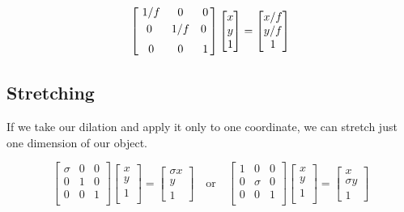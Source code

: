 \documentclass{article}
\begin{document}
\[%
    \begin{bmatrix} \vspace{1mm}
        \ 1/f  & 0 & 0 \\ \vspace{1mm} 
        0 & 1/f  & 0 \vspace{1mm}  \ \\ 
	    \ 0 & 0 & 1 \\		     
    \end{bmatrix}
    \begin{bmatrix} x\\y\\1 \end{bmatrix}
    =
    \begin{bmatrix}
        {x}/{f}  \\
        {y}/{f}  \\
		1 \\		
    \end{bmatrix}
\]%

\begin{figure}[!htbp]
    \centering
\end{figure}


\clearpage
\subsection{Stretching} 

If we take our dilation and apply it only to one coordinate, we can stretch just
one dimension of our object.

\[%
       \begin{bmatrix} 
        \sigma & 0 & 0 \\
		0 & 1 & 0 \\
		0 & 0 & 1 \\		
    \end{bmatrix}
    \begin{bmatrix}
        x \\
        y \\
		1 \\		
    \end{bmatrix}
    =
    \begin{bmatrix} \sigma x \\  y \\ 1 \end{bmatrix}
    \quad
    \text{or}
    \quad
    \begin{bmatrix} 
        1 & 0 & 0 \\
		0 & \sigma & 0 \\
		0 & 0 & 1 \\		
    \end{bmatrix}
    \begin{bmatrix}
        x \\
        y \\
		1 \\		
    \end{bmatrix}
    =
    \begin{bmatrix} x \\ \sigma y \\ 1 \end{bmatrix}\]%
\end{document}
